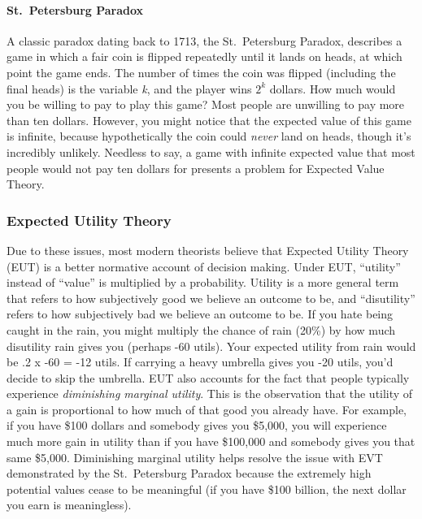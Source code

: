 \documentclass[
]{krantz}
\begin{document}
\paragraph*{St.~Petersburg Paradox}\label{st.-petersburg-paradox}

A classic paradox dating back to 1713, the St.~Petersburg Paradox, describes a game in which a fair coin is flipped repeatedly until it lands on heads, at which point the game ends. The number of times the coin was flipped (including the final heads) is the variable \emph{k}, and the player wins \(2^k\) dollars. How much would you be willing to pay to play this game? Most people are unwilling to pay more than ten dollars. However, you might notice that the expected value of this game is infinite, because hypothetically the coin could \emph{never} land on heads, though it's incredibly unlikely. Needless to say, a game with infinite expected value that most people would not pay ten dollars for presents a problem for Expected Value Theory.

\subsubsection*{Expected Utility Theory}\label{expected-utility-theory}


Due to these issues, most modern theorists believe that Expected Utility Theory (EUT) is a better normative account of decision making. Under EUT, ``utility'' instead of ``value'' is multiplied by a probability. Utility is a more general term that refers to how subjectively good we believe an outcome to be, and ``disutility'' refers to how subjectively bad we believe an outcome to be. If you hate being caught in the rain, you might multiply the chance of rain (20\%) by how much disutility rain gives you (perhaps -60 utils). Your expected utility from rain would be .2 x -60 = -12 utils. If carrying a heavy umbrella gives you -20 utils, you'd decide to skip the umbrella. EUT also accounts for the fact that people typically experience \emph{diminishing marginal utility}. This is the observation that the utility of a gain is proportional to how much of that good you already have. For example, if you have \$100 dollars and somebody gives you \$5,000, you will experience much more gain in utility than if you have \$100,000 and somebody gives you that same \$5,000. Diminishing marginal utility helps resolve the issue with EVT demonstrated by the St.~Petersburg Paradox because the extremely high potential values cease to be meaningful (if you have \$100 billion, the next dollar you earn is meaningless).
\end{document}
